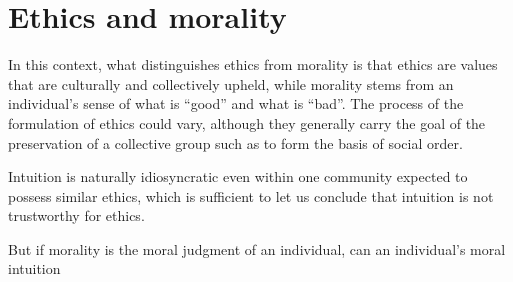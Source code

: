 \documentclass{scrartcl}
\begin{document}
\section{Ethics and morality}

In this context, what distinguishes ethics from morality is that ethics
are values that are culturally and collectively upheld, while morality
stems from an individual's sense of what is ``good'' and what is
``bad''. The process of the formulation of ethics could vary, although
they generally carry the goal of the preservation of a collective group
such as to form the basis of social order.

Intuition is naturally idiosyncratic even within one community expected
to possess similar ethics, which is sufficient to let us conclude that
intuition is not trustworthy for ethics.

But if morality is the moral judgment of an individual, can an
individual's moral intuition

\printbibliography
\end{document}
